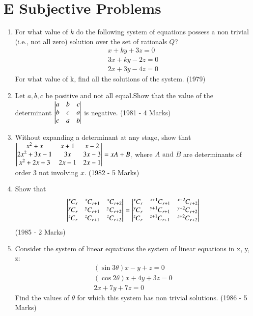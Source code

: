 \documentclass[journal,12pt,twocolumn]{IEEEtran}
\newcommand\Comb[2][^n]{\prescript{#1\mkern-0.5mu}{}C_{#2}}
\theoremstyle{remark}
\begin{document}
\section{E Subjective Problems}
\begin{enumerate}
\item For what value of $k$ do the following system of equations possess a non trivial (i.e., not all zero) solution over the set of rationals $Q$?\begin{align*}
x+ky+3z=0\\3x+ky-2z=0\\2x+3y-4z=0\end{align*} For what value of k, find all the solutions of the system. \hfill (1979)\\[2pt]

\item Let $a,b,c$ be positive and not all equal.Show that the value of the determinant $\begin{vmatrix}a&b&c\\b&c&a\\c&a&b\end{vmatrix}$ is negative. \hfill (1981 - 4 Marks)\\[2pt]

\item Without expanding a determinant at any stage, show that $\begin{vmatrix}x^2+x&x+1&x-2\\2x^2+3x-1&3x&3x-3\\x^2+2x+3&2x-1&2x-1\end{vmatrix}=xA+B$, where $A\text{ and }B$ are determinants of order 3 not involving $x$. \hfill (1982 - 5 Marks)\\[2pt]

\item Show that $$\mydet{\Comb[x]{r}&\Comb[x]{r+1}&\Comb[x]{r+2}\\\Comb[y]{r}&\Comb[y]{r+1}&\Comb[y]{r+2}\\\Comb[z]{r}&\Comb[z]{r+1}&\Comb[z]{r+2}}=\mydet{\Comb[x]{r}&\Comb[x+1]{r+1}&\Comb[x+2]{r+2}\\\Comb[y]{r}&\Comb[y+1]{r+1}&\Comb[y+2]{r+2}\\\Comb[z]{r}&\Comb[z+1]{r+1}&\Comb[z+2]{r+2}}$$ \hfill (1985 - 2 Marks)\\[2pt]

\item Consider the system of linear equations the system of linear equations in x, y, z:\begin{align*}(\sin 3\theta) x-y+z=0\\(\cos 2\theta)x+4y+3z=0\\2x+7y+7z=0\end{align*} Find the values of $\theta$ for which this system has non trivial solutions. \hfill (1986 - 5 Marks)\\[2pt]


\end{enumerate}
\end{document}
